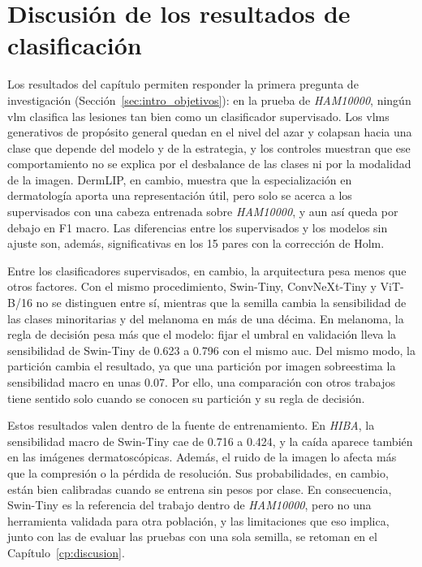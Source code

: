 \section{Discusión de los resultados de clasificación}
\label{sec:res_clasif_discusion}

Los resultados del capítulo permiten responder la primera pregunta de investigación
(Sección~\ref{sec:intro_objetivos}): en la prueba de \emph{HAM10000}, ningún \gls{vlm} clasifica las lesiones tan bien
como un clasificador supervisado. Los \glspl{vlm} generativos de propósito general quedan en el nivel del azar y
colapsan hacia una clase que depende del modelo y de la estrategia, y los controles muestran que ese comportamiento no
se explica por el desbalance de las clases ni por la modalidad de la imagen. DermLIP, en cambio, muestra que la
especialización en dermatología aporta una representación útil, pero solo se acerca a los supervisados con una cabeza
entrenada sobre \emph{HAM10000}, y aun así queda por debajo en F1 macro. Las diferencias entre los supervisados y los
modelos sin ajuste son, además, significativas en los 15 pares con la corrección de Holm.

Entre los clasificadores supervisados, en cambio, la arquitectura pesa menos que otros factores. Con el mismo
procedimiento, Swin-Tiny, ConvNeXt-Tiny y ViT-B/16 no se distinguen entre sí, mientras que la semilla cambia la
sensibilidad de las clases minoritarias y del melanoma en más de una décima. En melanoma, la regla de decisión pesa más
que el modelo: fijar el umbral en validación lleva la sensibilidad de Swin-Tiny de 0.623 a 0.796 con el mismo
\gls{auc}. Del mismo modo, la partición cambia el resultado, ya que una partición por imagen sobreestima la
sensibilidad macro en unas 0.07. Por ello, una comparación con otros trabajos tiene sentido solo cuando se conocen
su partición y su regla de decisión.

Estos resultados valen dentro de la fuente de entrenamiento. En \emph{HIBA}, la sensibilidad macro de Swin-Tiny cae
de 0.716 a 0.424, y la caída aparece también en las imágenes dermatoscópicas. Además, el ruido de la imagen lo afecta
más que la compresión o la pérdida de resolución. Sus probabilidades, en cambio, están bien calibradas cuando se
entrena sin pesos por clase. En consecuencia, Swin-Tiny es la referencia del trabajo dentro de \emph{HAM10000}, pero
no una herramienta validada para otra población, y las limitaciones que eso implica, junto con las de evaluar las pruebas
con una sola semilla, se retoman en el Capítulo~\ref{cp:discusion}.

